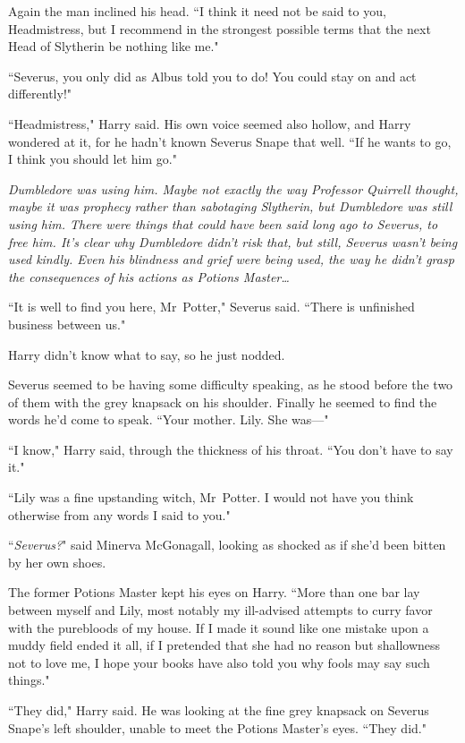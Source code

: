 Again the man inclined his head. ``I think it need not be said to you, Headmistress, but I recommend in the strongest possible terms that the next Head of Slytherin be nothing like me."

``Severus, you only did as Albus told you to do! You could stay on and act differently!"

``Headmistress," Harry said. His own voice seemed also hollow, and Harry wondered at it, for he hadn't known Severus Snape that well. ``If he wants to go, I think you should let him go."

\emph{Dumbledore was using him. Maybe not exactly the way Professor Quirrell thought, maybe it was prophecy rather than sabotaging Slytherin, but Dumbledore was still using him. There were things that could have been said long ago to Severus, to free him. It's clear why Dumbledore didn't risk that, but still, Severus wasn't being used kindly. Even his blindness and grief were being used, the way he didn't grasp the consequences of his actions as Potions Master{\ldots}}

``It is well to find you here, Mr~Potter," Severus said. ``There is unfinished business between us."

Harry didn't know what to say, so he just nodded.

Severus seemed to be having some difficulty speaking, as he stood before the two of them with the grey knapsack on his shoulder. Finally he seemed to find the words he'd come to speak. ``Your mother. Lily. She was—"

``I know," Harry said, through the thickness of his throat. ``You don't have to say it."

``Lily was a fine upstanding witch, Mr~Potter. I would not have you think otherwise from any words I said to you."

``\emph{Severus?}" said Minerva McGonagall, looking as shocked as if she'd been bitten by her own shoes.

The former Potions Master kept his eyes on Harry. ``More than one bar lay between myself and Lily, most notably my ill-advised attempts to curry favor with the purebloods of my house. If I made it sound like one mistake upon a muddy field ended it all, if I pretended that she had no reason but shallowness not to love me, I hope your books have also told you why fools may say such things."

``They did," Harry said. He was looking at the fine grey knapsack on Severus Snape's left shoulder, unable to meet the Potions Master's eyes. ``They did."


